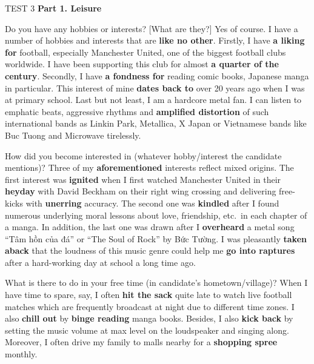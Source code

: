 \begin{glossarymc}[Cambridge 4]
    \begin{test}{TEST 3}
    \noindent
    \textbf{Part 1. Leisure}
	\begin{qa}{Do you have any hobbies or interests? [What are they?]}
	Yes of course. I have a number of hobbies and interests that are \textbf{like no other}. Firstly, I have \textbf{a liking for} football, especially Manchester United, one of the biggest football clubs worldwide. I have been supporting this club for almost \textbf{a quarter of the century}. Secondly, I have \textbf{a fondness for} reading comic books, Japanese manga in particular. This interest of mine \textbf{dates back to} over 20 years ago when I was at primary school. Last but not least, I am a hardcore metal fan. I can listen to emphatic beats, aggressive rhythms and \textbf{amplified distortion} of such international bands as Linkin Park, Metallica, X Japan or Vietnamese bands like Buc Tuong and Microwave tirelessly.
	\end{qa}

	\begin{qa}{How did you become interested in (whatever hobby/interest the candidate mentions)?}
	Three of my \textbf{aforementioned} interests reflect mixed origins. The first interest was \textbf{ignited} when I first watched Manchester United in their \textbf{heyday} with David Beckham on their right wing crossing and delivering free-kicks with \textbf{unerring} accuracy. The second one was \textbf{kindled} after I found numerous underlying moral lessons about love, friendship, etc.\ in each chapter of a manga. In addition, the last one was drawn after I \textbf{overheard} a metal song “Tâm hồn của đá” or “The Soul of Rock” by Bức Tường. I was pleasantly \textbf{taken aback} that the loudness of this music genre could help me \textbf{go into raptures} after a hard-working day at school a long time ago.
	\end{qa}

	\begin{qa}{What is there to do in your free time (in candidate's hometown/village)?}
	When I have time to spare, say, I often \textbf{hit the sack} quite late to watch live football matches which are frequently broadcast at night due to different time zones. I also \textbf{chill out} by \textbf{binge reading} manga books. Besides, I also \textbf{kick back} by setting the music volume at max level on the loudspeaker and singing along. Moreover, I often drive my family to malls nearby for a \textbf{shopping spree} monthly.
	\end{qa}


\end{test}
\end{glossarymc}
